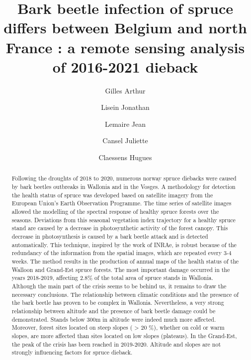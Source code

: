 \documentclass[3p,procedia]{elsarticle}
\begin{document}
\begin{frontmatter}

\author[label2]{Gilles Arthur}
\author[label2]{Lisein Jonathan}
\author[label3]{Lemaire Jean}
\author[label3]{Cansel Juliette}
\author[label2]{Claessens Hugues}



\title{Bark beetle infection of spruce differs between Belgium and north France : a remote sensing analysis of 2016-2021 dieback}

\begin{abstract}
Following the droughts of 2018 to 2020, numerous norway spruce diebacks were caused by bark beetles 
outbreaks in Wallonia and in the Vosges. 
A methodology for detection the health status of spruce was developed based on satellite imagery from the European Union's Earth Observation Programme.
The time series of satellite images allowed the modelling of the spectral response of healthy spruce forests over the seasons. Deviations from this seasonal vegetation index trajectory for a healthy spruce stand are caused by a decrease in photosynthetic activity of the forest canopy.
This decrease in photosynthesis is caused by a bark beetle attack and is detected automatically.
This technique, inspired by the work of INRAe, is robust because of the redundancy of the information from the spatial images, which are repeated every 3-4 weeks. 
The method results in the production of annual maps of the health status of the Walloon and Grand-Est spruce forests.
The most important damage occurred in the years 2018-2019, affecting 2.8\% of the total area of spruce stands in Wallonia.
Although the main part of the crisis seems to be behind us, it remains to draw the necessary conclusions.
The relationship between climatic conditions and the presence of the bark beetle has proven to be complex in Wallonia.
Nevertheless, a very strong relationship between altitude and the presence of bark beetle damage could be demonstrated.
Stands below 300m in altitude were indeed much more affected.
Moreover, forest sites located on steep slopes ( > 20 \%), whether on cold or warm slopes, are more affected than sites located on low slopes (plateaus). In the Grand-Est, the peak of the crisis has been reached in 2019-2020. Altitude and slopes are not strongly influencing factors for spruce dieback. 


\end{abstract}

\begin{keyword}
\end{keyword}

\end{frontmatter}
\end{document}
